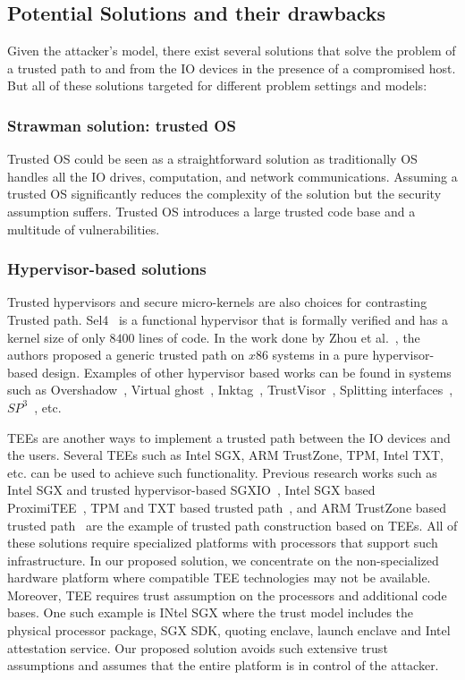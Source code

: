 \subsection{Potential Solutions and their drawbacks}

Given the attacker's model, there exist several solutions that solve the problem of a trusted path to and from the IO devices in the presence of a compromised host. But all of these solutions targeted for different problem settings and models:

\subsubsection{Strawman solution: trusted OS} Trusted OS could be seen as a straightforward solution as traditionally OS handles all the IO drives, computation, and network communications. Assuming a trusted OS significantly reduces the complexity of the solution but the security assumption suffers. Trusted OS introduces a large trusted code base and a multitude of vulnerabilities. 

\subsubsection{Hypervisor-based solutions} Trusted hypervisors and secure micro-kernels are also choices for contrasting Trusted path. Sel4~\cite{klein2009sel4} is a functional hypervisor that is formally verified and has a kernel size of only $8400$ lines of code. In the work done by Zhou et al.~\cite{zhou2012building}, the authors proposed a generic trusted path on $x86$ systems in a pure hypervisor-based design. Examples of other hypervisor based works can be found in systems such as Overshadow~\cite{Overshadow}, Virtual ghost~\cite{criswell2014virtual}, Inktag~\cite{hofmann2013inktag}, TrustVisor~\cite{mccune2010trustvisor}, Splitting interfaces~\cite{ta2006splitting}, $SP^3$~\cite{yang2008using}, etc.

 TEEs are another ways to implement a trusted path between the IO devices and the users. Several TEEs such as Intel SGX, ARM TrustZone, TPM, Intel TXT, etc. can be used to achieve such functionality. Previous research works such as Intel SGX and trusted hypervisor-based SGXIO~\cite{weiser2017sgxio}, Intel SGX based ProximiTEE~\cite{dhar2018proximitee}, TPM and TXT based trusted path~\cite{filyanov2011uni}, and ARM TrustZone based trusted path~\cite{filyanov2011uni,sun2015trustotp} are the example of trusted path construction based on TEEs. All of these solutions require specialized platforms with processors that support such infrastructure. In our proposed solution, we concentrate on the non-specialized hardware platform where compatible TEE technologies may not be available.
Moreover, TEE requires trust assumption on the processors and additional code bases. One such example is INtel SGX where the trust model includes the physical processor package, SGX SDK, quoting enclave, launch enclave and Intel attestation service. Our proposed solution avoids such extensive trust assumptions and assumes that the entire platform is in control of the attacker.


